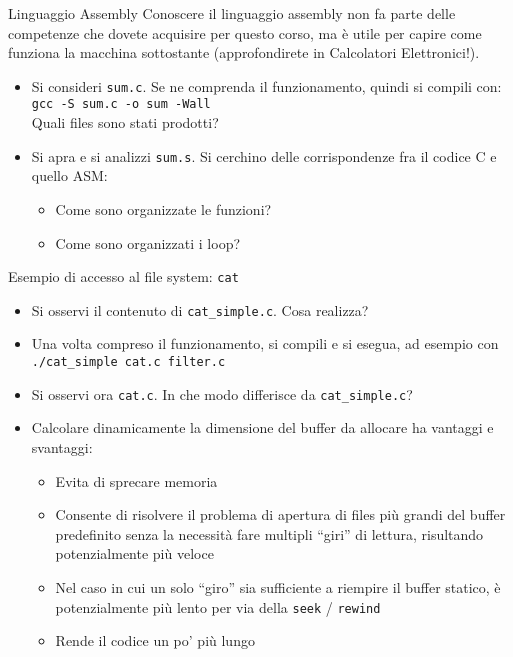 \documentclass{beamer}
\begin{document}
\begin{frame}[fragile]{Linguaggio Assembly}
Conoscere il linguaggio assembly non fa parte delle competenze che dovete acquisire per questo corso, ma è utile per capire come funziona la macchina sottostante (approfondirete in Calcolatori Elettronici!).
\begin{itemize}
 \item Si consideri \texttt{sum.c}. Se ne comprenda il funzionamento, quindi si compili con: \\ \texttt{gcc -S sum.c -o sum -Wall} \\ Quali files sono stati prodotti?
 \item Si apra e si analizzi \texttt{sum.s}. Si cerchino delle corrispondenze fra il codice C e quello ASM:
  \begin{itemize}
    \item Come sono organizzate le funzioni?
    \item Come sono organizzati i loop?
  \end{itemize}
\end{itemize}
\end{frame}

\begin{frame}[fragile]{Esempio di accesso al file system: \texttt{cat}}
\begin{itemize}
 \item Si osservi il contenuto di \texttt{cat\_simple.c}. Cosa realizza?
 \item Una volta compreso il funzionamento, si compili e si esegua, ad esempio con \\ \texttt{./cat\_simple cat.c filter.c}
 \item Si osservi ora \texttt{cat.c}. In che modo differisce da \texttt{cat\_simple.c}?
 \item Calcolare dinamicamente la dimensione del buffer da allocare ha vantaggi e svantaggi:
 \begin{itemize}
  \item Evita di sprecare memoria
  \item Consente di risolvere il problema di apertura di files più grandi del buffer predefinito senza la necessità fare multipli ``giri'' di lettura, risultando potenzialmente più veloce
  \item Nel caso in cui un solo ``giro'' sia sufficiente a riempire il buffer statico, è potenzialmente più lento per via della \texttt{seek} / \texttt{rewind}
  \item Rende il codice un po' più lungo
 \end{itemize}
\end{itemize}
\end{frame}
\end{document}
